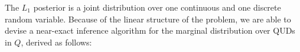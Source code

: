 \documentclass[9pt,twocolumn,twoside,lineno]{pnas-new}
\newcommand{\Listener}{L}
\newcommand{\QLONE}{\Listener_{{1}}^{{Q}}}
\begin{document}
{	%




























	The $L_1$ posterior is a joint distribution over one continuous and one discrete random variable. 
	Because of the linear structure of the problem, we are able to devise a near-exact inference algorithm for the marginal distribution over QUDs in $Q$, derived as follows:



}
\end{document}
